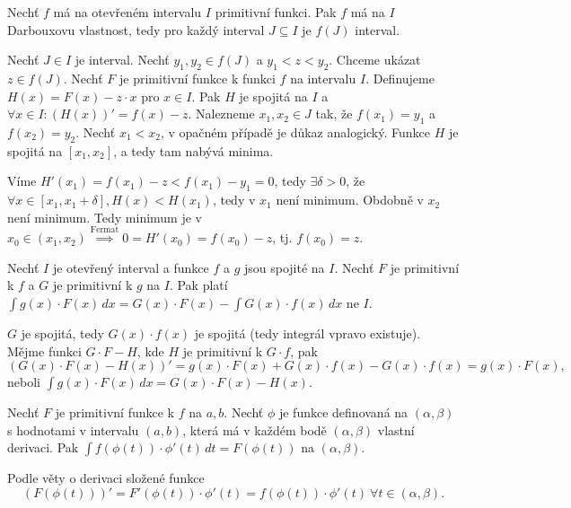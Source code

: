 \documentclass[12pt]{article}                   %
\begin{document}
        \begin{veta}
            Nechť $f$ má na otevřeném intervalu $I$ primitivní funkci. Pak $f$ má na $I$ Darbouxovu vlastnost, tedy pro každý interval $J \subseteq I$ je $f(J)$ interval.

            \begin{dukazin}
                Nechť $J \in I$ je interval. Nechť $y_1, y_2 \in f(J)$ a $y_1 < z < y_2$. Chceme ukázat $z \in f(J)$. Nechť $F$ je primitivní funkce k funkci $f$ na intervalu $I$. Definujeme $H(x) = F(x) - z·x$ pro $x \in I$. Pak $H$ je spojitá na $I$ a $\forall x \in I: (H(x))' = f(x) - z$. Nalezneme $x_1, x_2 \in J$ tak, že $f(x_1) = y_1$ a $f(x_2) = y_2$. Nechť $x_1 < x_2$, v opačném případě je důkaz analogický. Funkce $H$ je spojitá na $[x_1, x_2]$, a tedy tam nabývá minima.

                Víme $H'(x_1) = f(x_1) - z < f(x_1) - y_1 = 0$, tedy $\exists \delta > 0$, že $\forall x \in [x_1, x_1+\delta], H(x) < H(x_1)$, tedy v $x_1$ není minimum. Obdobně v $x_2$ není minimum. Tedy minimum je v $x_0 \in (x_1, x_2) \overset{\text{Fermat}}{\implies} 0 = H'(x_0) = f(x_0) - z$, tj. $f(x_0) = z$.
            \end{dukazin}
        \end{veta}


        \begin{veta}
            Nechť $I$ je otevřený interval a funkce $f$ a $g$ jsou spojité na $I$. Nechť $F$ je primitivní k $f$ a $G$ je primitivní k $g$ na $I$. Pak platí $\int g(x)·F(x)\,dx = G(x)·F(x) - \int G(x)·f(x)\,dx$ ne $I$.

            \begin{dukazin}
                $G$ je spojitá, tedy $G(x)·f(x)$ je spojitá (tedy integrál vpravo existuje). Mějme funkci $G·F - H$, kde $H$ je primitivní k $G·f$, pak
                $$ (G(x)·F(x) - H(x))' = g(x)·F(x) + G(x)·f(x) - G(x)·f(x) = g(x)·F(x), $$
                neboli $\int g(x)·F(x)\,dx = G(x)·F(x) - H(x)$.
            \end{dukazin}
        \end{veta}

        \begin{veta}[1. o substituci]
            Nechť $F$ je primitivní funkce k $f$ na $a, b$. Nechť $\phi$ je funkce definovaná na $(\alpha, \beta)$ s hodnotami v intervalu $(a, b)$, která má v každém bodě $(\alpha, \beta)$ vlastní derivaci. Pak $\int f(\phi(t))·\phi'(t)\,dt = F(\phi(t))$ na $(\alpha, \beta)$.

            \begin{dukazin}
                Podle věty o derivaci složené funkce
                $$ (F(\phi(t)))' = F'(\phi(t))·\phi'(t) = f(\phi(t))·\phi'(t)\ \forall t \in (\alpha, \beta). $$ 
            \end{dukazin}
        \end{veta}
\end{document}
